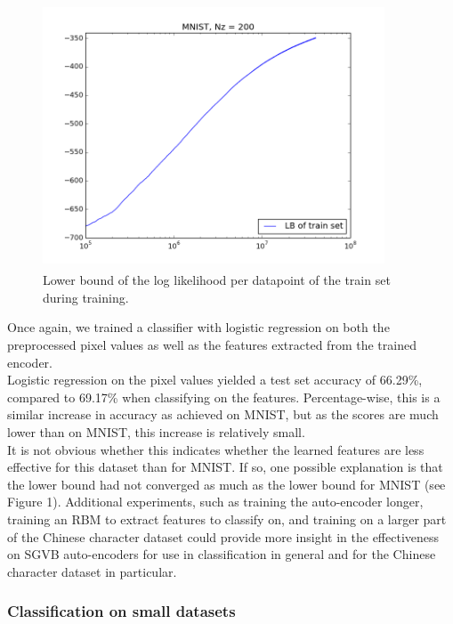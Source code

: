 \documentclass{article}
\begin{document}
\begin{figure}[htb]
\begin{center}
\includegraphics[height=3.1in,width=4in]{lowerboundchinese.png}
\caption{Lower bound of the log likelihood per datapoint of the train set during training.}
\end{center}
\end{figure}

Once again, we trained a classifier with logistic regression on both the preprocessed pixel values as well as the features extracted from the trained encoder. \\
Logistic regression on the pixel values yielded a test set accuracy of 66.29\%, compared to 69.17\% when classifying on the features. Percentage-wise, this is a similar increase in accuracy as achieved on MNIST, but as the scores are much lower than on MNIST, this increase is relatively small. \\
It is not obvious whether this indicates whether the learned features are less effective for this dataset than for MNIST. If so, one possible explanation is that the lower bound had not converged as much as the lower bound for MNIST (see Figure 1). Additional experiments, such as training the auto-encoder longer, training an RBM to extract features to classify on, and training on a larger part of the Chinese character dataset could provide more insight in the effectiveness on SGVB auto-encoders for use in classification in general and for the Chinese character dataset in particular.


\subsubsection{Classification on small datasets}
\end{document}
